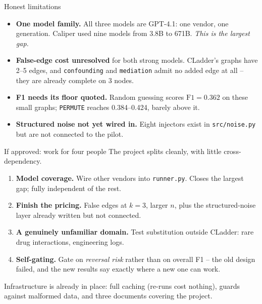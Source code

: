 \documentclass{beamer}
\begin{document}
\begin{frame}{Honest limitations}
  \begin{itemize}
    \item \textbf{One model family.} All three models are GPT-4.1: one vendor,
      one generation. Caliper used nine models from 3.8B to 671B.
      \emph{This is the largest gap.}
    \item \textbf{False-edge cost unresolved} for both strong models. CLadder's
      graphs have 2--5 edges, and \texttt{confounding} and \texttt{mediation}
      admit no added edge at all -- they are already complete on 3 nodes.
    \item \textbf{F1 needs its floor quoted.} Random guessing scores
      $\mathrm{F1} = 0.362$ on these small graphs; \texttt{PERMUTE} reaches
      0.384--0.424, barely above it.
    \item \textbf{Structured noise not yet wired in.} Eight injectors exist in
      \texttt{src/noise.py} but are not connected to the pilot.
  \end{itemize}
\end{frame}

\begin{frame}{If approved: work for four people}
  The project splits cleanly, with little cross-dependency.

  \vspace{0.2cm}
  \begin{enumerate}
    \item \textbf{Model coverage.} Wire other vendors into \texttt{runner.py}.
      Closes the largest gap; fully independent of the rest.
    \item \textbf{Finish the pricing.} False edges at $k{=}3$, larger $n$,
      plus the structured-noise layer already written but not connected.
    \item \textbf{A genuinely unfamiliar domain.} Test substitution outside
      CLadder: rare drug interactions, engineering logs.
    \item \textbf{Self-gating.} Gate on \emph{reversal risk} rather than on
      overall F1 -- the old design failed, and the new results say exactly
      where a new one can work.
  \end{enumerate}

  \vspace{0.3cm}
  Infrastructure is already in place: full caching (re-runs cost nothing),
  guards against malformed data, and three documents covering the project.
\end{frame}
\end{document}
